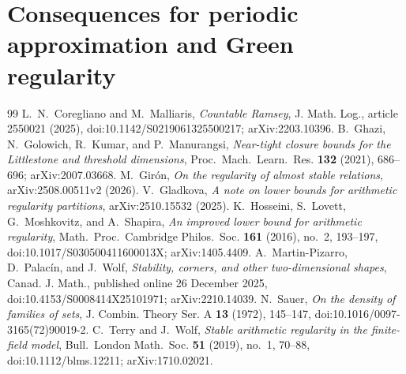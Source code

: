 \documentclass[10pt,a4paper]{amsart}
\numberwithin{theorem}{section}
\begin{document}
\section{Consequences for periodic approximation and Green regularity}\label{sec:consequences}


\begin{thebibliography}{99}
 L.~N.~Coregliano and M.~Malliaris, \emph{Countable Ramsey}, J. Math. Log., article 2550021 (2025), doi:10.1142/S0219061325500217; arXiv:2203.10396.
 B.~Ghazi, N.~Golowich, R.~Kumar, and P.~Manurangsi, \emph{Near-tight closure bounds for the Littlestone and threshold dimensions}, Proc.\ Mach.\ Learn.\ Res. \textbf{132} (2021), 686--696; arXiv:2007.03668.
 M.~Gir\'on, \emph{On the regularity of almost stable relations}, arXiv:2508.00511v2 (2026).
 V.~Gladkova, \emph{A note on lower bounds for arithmetic regularity partitions}, arXiv:2510.15532 (2025).
 K.~Hosseini, S.~Lovett, G.~Moshkovitz, and A.~Shapira, \emph{An improved lower bound for arithmetic regularity}, Math.\ Proc.\ Cambridge Philos.\ Soc. \textbf{161} (2016), no.~2, 193--197, doi:10.1017/S030500411600013X; arXiv:1405.4409.
 A.~Martin-Pizarro, D.~Palac\'in, and J.~Wolf, \emph{Stability, corners, and other two-dimensional shapes}, Canad. J. Math., published online 26 December 2025, doi:10.4153/S0008414X25101971; arXiv:2210.14039.
 N.~Sauer, \emph{On the density of families of sets}, J. Combin. Theory Ser. A \textbf{13} (1972), 145--147, doi:10.1016/0097-3165(72)90019-2.
 C.~Terry and J.~Wolf, \emph{Stable arithmetic regularity in the finite-field model}, Bull.\ London Math.\ Soc. \textbf{51} (2019), no.~1, 70--88, doi:10.1112/blms.12211; arXiv:1710.02021.
\end{thebibliography}
\end{document}
